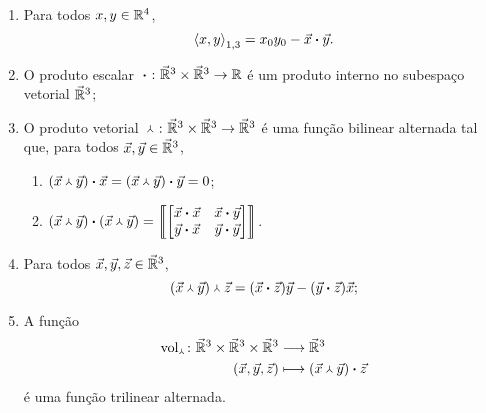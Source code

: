 \begin{exercise}
	\begin{enumerate}
	\item Para todos $x,y \in \mathbb{R}^4$,
		\begin{equation*}
		\left\langle{x},{y}\right\rangle_{1,3} = {x}_0{y}_0-{\vec{x}} \bm{\cdot} {\vec{y}}.
		\end{equation*}

	\item O produto escalar ${} \bm{\cdot} {}\colon \vec{\mathbb{R}}^3 \times \vec{\mathbb{R}}^3 \to \mathbb{R}$ é um produto interno no subespaço vetorial $\vec{\mathbb{R}}^3$;
	
	\item O produto vetorial ${} \Yup {}\colon \vec{\mathbb{R}}^3 \times \vec{\mathbb{R}}^3 \to \vec{\mathbb{R}}^3$ é uma função bilinear alternada tal que, para todos $\vec{x},\vec{y} \in \vec{\mathbb{R}}^3$,
		\begin{enumerate}
		\item ${({\vec{x}} \Yup {\vec{y}})} \bm{\cdot} {\vec{x}} = {({\vec{x}} \Yup {\vec{y}})} \bm{\cdot} {\vec{y}} = 0$;
		
		\item ${({\vec{x}} \Yup {\vec{y}})} \bm{\cdot} {({\vec{x}} \Yup {\vec{y}})} =
				\left\llbracket{
					\begin{bmatrix}
					{\vec{x}} \bm{\cdot} {\vec{x}} & {\vec{x}} \bm{\cdot} {\vec{y}} \\
					{\vec{y}} \bm{\cdot} {\vec{x}} & {\vec{y}} \bm{\cdot} {\vec{y}}
					\end{bmatrix}
				}\right\rrbracket$.
		\end{enumerate}
	
	\item Para todos $\vec{x},\vec{y},\vec{z} \in \vec{\mathbb{R}}^3$,
		\begin{equation*}
		{({\vec{x}} \Yup {\vec{y}})} \Yup {\vec{z}} = ({\vec{x}} \bm{\cdot} {\vec{z}})\vec{y} - ({\vec{y}} \bm{\cdot} {\vec{z}})\vec{x};
		\end{equation*}
	
	\item A função
		\begin{align*}
		{\operatorname{vol}_{\Yup}}\colon {\vec{\mathbb{R}}^3 \times \vec{\mathbb{R}}^3 \times \vec{\mathbb{R}}^3} &\longrightarrow {\vec{\mathbb{R}}^3} \\{(\vec{x},\vec{y},\vec{z})} &\longmapsto {({\vec{x}} \Yup {\vec{y}})} \bm{\cdot} {\vec{z}}
		\end{align*}
é uma função trilinear alternada.

	\end{enumerate}
\end{exercise}


